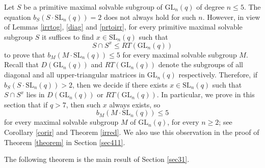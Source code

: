 \documentclass[a4paper,reqno,11pt]{amsart}
\theoremstyle{definition}
\theoremstyle{remark}
\numberwithin{equation}{section}
\newcommand{\SL}{{\mathrm{SL}}}
\newcommand{\GL}{{\mathrm{GL}}}
\begin{document}
Let $S$ be a  primitive maximal solvable subgroup of $\GL_n(q)$ of  degree $n \le 5.$ The equation  $b_S(S \cdot \SL_n(q))=2$ does not always hold for such $n$. However, in view of Lemmas %
\ref{irrtog}, \ref{diag}   and \ref{prtoirr}, for every primitive maximal  solvable subgroup $S$ it suffices  to find $x \in \SL_n(q)$  such that
\begin{equation*}%
 S \cap S^x \le RT(\GL_n(q))
\end{equation*}
 to prove that $b_M(M \cdot \SL_n(q)) \le 5$ for every maximal solvable subgroup $M$.  Recall that $D(\GL_n(q))$ and $RT(\GL_n(q))$ denote the subgroups of all diagonal and all upper-triangular matrices in $\GL_n(q)$ respectively. Therefore, if $b_S(S \cdot \SL_n(q))>2$, then we decide if there exists $x \in \SL_n(q)$ such that  $S \cap S^x$ lies in $D(\GL_n(q))$ or $RT(\GL_n(q)).$ In particular, we prove in this section that if $q>7$, then such $x$ always exists, so  $$b_M(M \cdot \SL_n(q)) \le 5$$
for every maximal solvable subgroup $M$ of $\GL_n(q)$, for every $n \ge 2$; see Corollary \ref{corir} and Theorem \ref{irred}. We also use this observation in the proof of Theorem \ref{theorem} in Section \ref{sec411}.


\medskip

The following theorem is the main result of Section \ref{sec31}.
\end{document}

